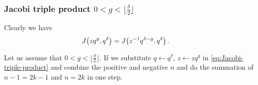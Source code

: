\documentclass{article}
\begin{document}
\subsubsection{Jacobi triple product $0<g<\lfloor\frac{\delta}{2}\rfloor$}

Clearly we have
\begin{align}
  J\!\left(zq^g,q^\delta\right)
  &=
  J\!\left(z^{-1}q^{\delta-g},q^\delta\right).
  \label{eq:Jacobi-g-delta-g}
\end{align}

Let us assume that $0 < g < \lfloor \frac{\delta}{2}\rfloor$. If we
substitute $q \gets q^\delta$, $z \gets z q^g$ in
\eqref{eq:Jacobi-triple-product} and combine the positive and negative
$n$ and do the summation of $n-1=2k-1$ and $n=2k$ in one step.
\end{document}
